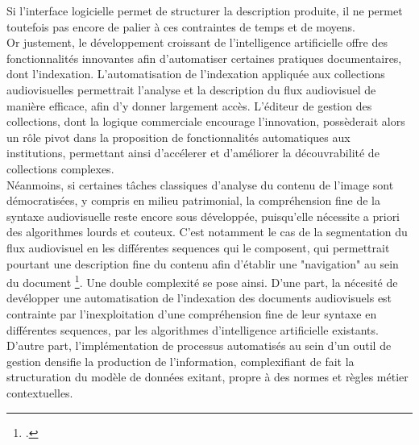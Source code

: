 Si l'interface logicielle permet de structurer la description produite, il ne permet toutefois pas encore de palier à ces contraintes de temps et de moyens. \\
Or justement, le développement croissant de l'intelligence artificielle offre des fonctionnalités innovantes afin d'automatiser certaines pratiques documentaires, dont l'indexation. L'automatisation de l'indexation appliquée aux collections audiovisuelles permettrait l'analyse et la description du flux audiovisuel de manière efficace, afin d'y donner largement accès. L'éditeur de gestion des collections, dont la logique commerciale encourage l'innovation, possèderait alors un rôle pivot dans la proposition de fonctionnalités automatiques aux institutions, permettant ainsi d'accélerer et d'améliorer la découvrabilité de collections complexes. \\
Néanmoins, si certaines tâches classiques d'analyse du contenu de l'image sont démocratisées, y compris en milieu patrimonial, la compréhension fine de la syntaxe audiovisuelle reste encore sous développée, puisqu'elle nécessite a priori des algorithmes lourds et couteux. C'est notamment le cas de la segmentation du flux audiovisuel en les différentes \gls{sequence}s qui le composent, qui permettrait pourtant une description fine du contenu afin d'établir une "navigation" au sein du document \footcite{bachimont1998}. Une double complexité se pose ainsi. D'une part, la nécesité de devélopper une automatisation de l'indexation des documents audiovisuels est contrainte par l'inexploitation d'une compréhension fine de leur syntaxe en différentes \gls{sequence}s, par les algorithmes d'intelligence artificielle existants. D'autre part, l'implémentation de processus automatisés au sein d'un outil de gestion densifie la production de l'information, complexifiant de fait la structuration du modèle de données exitant, propre à des normes et règles métier contextuelles. 

